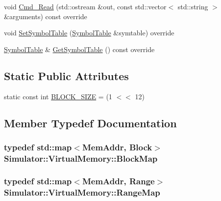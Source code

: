 \begin{DoxyCompactItemize}
\item 
void \hyperlink{class_simulator_1_1_virtual_memory_a5280eee601bbcd4885b6c5343b4bb935}{Cmd\+\_\+\+Read} (std\+::ostream \&out, const std\+::vector$<$ std\+::string $>$ \&arguments) const override
\item 
void \hyperlink{class_simulator_1_1_virtual_memory_ae2433822a32553ec6f1dd8d371e164bd}{Set\+Symbol\+Table} (\hyperlink{class_simulator_1_1_symbol_table}{Symbol\+Table} \&symtable) override
\item 
\hyperlink{class_simulator_1_1_symbol_table}{Symbol\+Table} \& \hyperlink{class_simulator_1_1_virtual_memory_ac7a1f11d68444825e86236484984ca44}{Get\+Symbol\+Table} () const override
\end{DoxyCompactItemize}
\subsection*{Static Public Attributes}
\begin{DoxyCompactItemize}
\item 
static const int \hyperlink{class_simulator_1_1_virtual_memory_a84e20b875917ceb9a44d32cfb2d59246}{B\+L\+O\+C\+K\+\_\+\+S\+I\+Z\+E} = (1 $<$$<$ 12)
\end{DoxyCompactItemize}


\subsection{Member Typedef Documentation}
\hypertarget{class_simulator_1_1_virtual_memory_ada38033e776f02935cf46de8b0ce7615}{
\subsubsection[{Block\+Map}]{\setlength{\rightskip}{0pt plus 5cm}typedef std\+::map$<$Mem\+Addr, {\bf Block}$>$ {\bf Simulator\+::\+Virtual\+Memory\+::\+Block\+Map}}}\label{class_simulator_1_1_virtual_memory_ada38033e776f02935cf46de8b0ce7615}
\hypertarget{class_simulator_1_1_virtual_memory_ac7a5d13c3ba7bfcc6729bc4ccbe8bc7e}{
\subsubsection[{Range\+Map}]{\setlength{\rightskip}{0pt plus 5cm}typedef std\+::map$<$Mem\+Addr, {\bf Range}$>$ {\bf Simulator\+::\+Virtual\+Memory\+::\+Range\+Map}}}\label{class_simulator_1_1_virtual_memory_ac7a5d13c3ba7bfcc6729bc4ccbe8bc7e}


